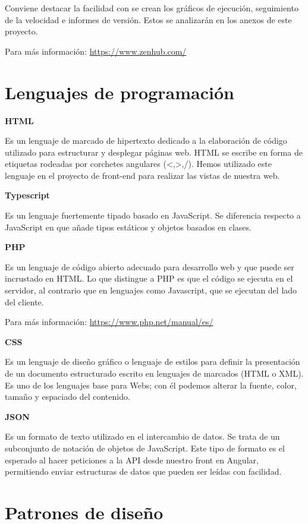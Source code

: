 Conviene destacar la facilidad con se crean los gráficos de ejecución, seguimiento de la velocidad e informes de versión. Estos se  analizarán en los anexos de este proyecto.

Para más información: \url{https://www.zenhub.com/}

\section{Lenguajes de programación}


\textbf{HTML}

Es un lenguaje de marcado de hipertexto dedicado a la elaboración de código utilizado para estructurar y desplegar  páginas web.
HTML se escribe en forma de etiquetas rodeadas por corchetes angulares (<,>,/). Hemos utilizado este lenguaje en el proyecto de front-end  para realizar las vistas de nuestra web.

\textbf{Typescript}

Es un lenguaje fuertemente tipado basado en JavaScript. Se diferencia respecto a JavaScript en que añade tipos estáticos y objetos basados en clases.

\textbf{PHP}

Es un lenguaje de código abierto adecuado para desarrollo web y que puede ser incrustado en HTML. Lo que distingue a PHP es que el código se ejecuta en el servidor, al contrario que en lenguajes como Javascript, que se ejecutan del lado del cliente.

Para más información: \url{https://www.php.net/manual/es/}

\textbf{CSS}

Es un lenguaje de diseño gráfico o lenguaje de estilos para definir la presentación de un documento estructurado escrito en lenguajes de marcados (HTML o XML). Es uno de los lenguajes base para Webs; con él podemos alterar la fuente, color, tamaño y espaciado del contenido.

\textbf{JSON}

Es un formato de texto utilizado en el intercambio de datos. Se trata de un subconjunto de notación de objetos de JavaScript.
Este tipo de formato es el esperado al hacer peticiones a la API desde nuestro front en Angular, permitiendo enviar estructuras de datos que pueden ser leídas con facilidad.

\section{Patrones de diseño}

